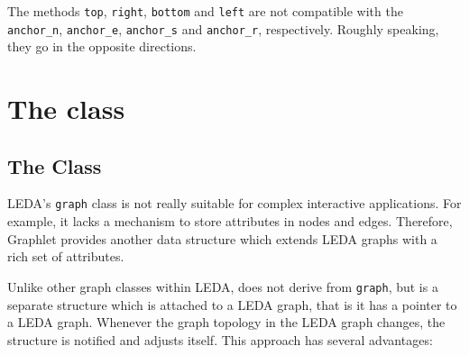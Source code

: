 \documentclass[twoside,fleqn]{report}
\begin{document}
\begin{notes}
  \item The methods \texttt{top}, \texttt{right}, \texttt{bottom} and 
  \texttt{left} are not compatible with the \texttt{anchor\_n}, 
  \texttt{anchor\_e}, \texttt{anchor\_s} and \texttt{anchor\_r}, 
  respectively. Roughly speaking, they go in the opposite directions.
\end{notes}


%
%

\chapter{The class }
\label{c:GT_Graph}



%
%

\section{The Class }

LEDA's \texttt{graph} class is not really suitable for complex
interactive applications. For example, it lacks a mechanism to
store attributes in nodes and edges. Therefore, Graphlet provides
another data structure  which extends LEDA graphs with
a rich set of attributes.

Unlike other graph classes within LEDA,  does not
derive from \texttt{graph}, but is a separate structure which is
attached to a LEDA graph, that is it has a pointer to a LEDA
graph.  Whenever the graph topology in the LEDA graph changes,
the  structure is notified and adjusts itself.  This
approach has several advantages:
\end{document}
